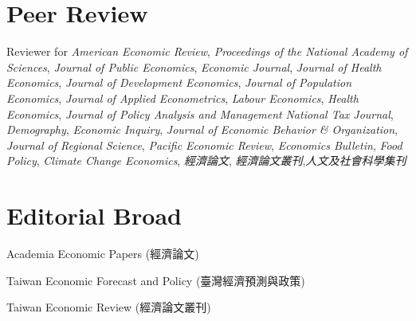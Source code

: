\documentclass[10pt,letterpaper]{article}
\renewenvironment{itemize}{
  \begin{list}{}{
      \setlength{\leftmargin}{1.5em}
      \setlength{\itemsep}{0.25em}
      \setlength{\parskip}{0pt}
      \setlength{\parsep}{0.25em}
    }
}{
  \end{list}
}
\begin{document}
%




\section*{\textbf{Peer Review}}

Reviewer for
\textit{American Economic Review}, \textit{Proceedings of the National Academy of Sciences}, \textit{Journal of Public Economics}, \textit{Economic Journal}, \textit{Journal of Health Economics}, \textit{Journal of Development Economics}, \textit{Journal of Population Economics},  \textit{Journal of Applied Econometrics}, \textit{Labour Economics}, \textit{Health Economics}, \textit{Journal of Policy Analysis and Management} \textit{National Tax Journal}, \textit{Demography},
\textit{Economic Inquiry}, \textit{Journal of Economic Behavior \& Organization},  \textit{Journal of Regional Science}, 
\textit{Pacific Economic Review},
\textit{Economics Bulletin}, \textit{Food Policy}, \textit{Climate Change Economics},
\textit{經濟論文},
\textit{經濟論文叢刊},\textit{人文及社會科學集刊}


\section*{\textbf{Editorial Broad}}

\begin{itemize}
	\item Academia Economic Papers (經濟論文)
	\item Taiwan Economic Forecast and Policy (臺灣經濟預測與政策)
	\item Taiwan Economic Review (經濟論文叢刊)
	
\end{itemize}
\end{document}
